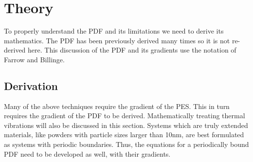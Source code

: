 \section{Theory}
To properly understand the PDF and its limitations we need to derive its mathematics.
The PDF has been previously derived many times so it is not re-derived here.
This discussion of the PDF and its gradients use the notation of Farrow and Billinge. \cite{Farrow2009}
\subsection{Derivation}
Many of the above techniques require the gradient of the PES.
This in turn requires the gradient of the PDF to be derived.
Mathematically treating thermal vibrations will also be discussed in this section.
Systems which are truly extended materials, like powders with particle sizes larger than 10nm, are best formulated as systems with periodic boundaries.
Thus, the equations for a periodically bound PDF need to be developed as well, with their gradients.
